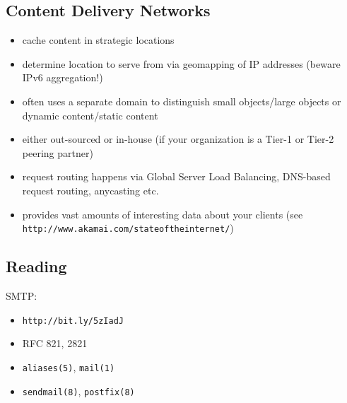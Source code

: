 \documentclass[xga]{xdvislides}
\begin{document}
\subsection{Content Delivery Networks}
\begin{itemize}
	\item cache content in strategic locations
	\item determine location to serve from via geomapping of IP
		addresses (beware IPv6 aggregation!)
	\item often uses a separate domain to distinguish small
		objects/large objects or dynamic content/static content
	\item either out-sourced or in-house (if your organization is a
		Tier-1 or Tier-2 peering partner)
	\item request routing happens via Global Server Load Balancing,
		DNS-based request routing, anycasting etc.
	\item provides vast amounts of interesting data about your clients
		(see \verb+http://www.akamai.com/stateoftheinternet/+)
\end{itemize}



\subsection{Reading}
SMTP:
\begin{itemize}
	\item \verb+http://bit.ly/5zIadJ+
	\item RFC 821, 2821
	\item \verb+aliases(5)+, \verb+mail(1)+
	\item \verb+sendmail(8)+, \verb+postfix(8)+
\end{itemize}
\end{document}
